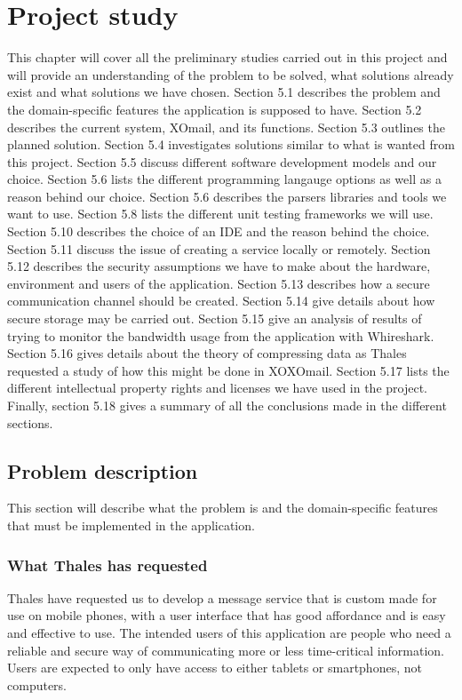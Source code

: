 \chapter{Project study}

This chapter will cover all the preliminary studies carried out in this project and will provide an understanding of the problem to be solved, what solutions already exist and what solutions we have chosen. Section 5.1 describes the problem and the domain-specific features the application is supposed to have. Section 5.2 describes the current system, XOmail, and its functions. Section 5.3 outlines the planned solution. Section 5.4 investigates solutions similar to what is wanted from this project. Section 5.5 discuss different software development models and our choice. Section 5.6 lists the different programming langauge options as well as a reason behind our choice. Section 5.6 describes the parsers libraries and tools we want to use. Section 5.8 lists the different unit testing frameworks we will use. Section 5.10 describes the choice of an IDE and the reason behind the choice. Section 5.11 discuss the issue of creating a service locally or remotely. Section 5.12 describes the security assumptions we have to make about the hardware, environment and users of the application. Section 5.13 describes how a secure communication channel should be created. Section 5.14 give details about how secure storage may be carried out. Section 5.15 give an analysis of results of trying to monitor the bandwidth usage from the application with Whireshark. Section 5.16 gives details about the theory of compressing data as Thales requested a study of how this might be done in XOXOmail. Section 5.17 lists the different intellectual property rights and licenses we have used in the project. Finally, section 5.18 gives a summary of all the conclusions made in the different sections.

\section{Problem description}

This section will describe what the problem is and the domain-specific features that must be implemented in the application.

\subsection{What Thales has requested}
Thales have requested us to develop a message service that is custom made for use on mobile phones, with a user interface that has good affordance and is easy and effective to use.
\newline
\newline
The intended users of this application are people who need a reliable and secure way of communicating more or less time-critical information. Users are expected to only have access to either tablets or smartphones, not computers.

